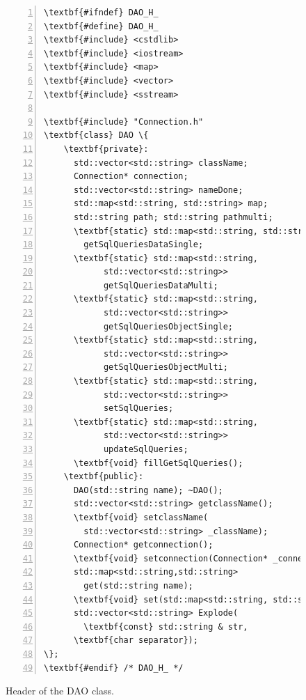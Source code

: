 \begin{figure}[t!h!]
\begin{minipage}{.45\paperwidth}
\begin{mylisting}
\begin{Verbatim}[commandchars=\\\{\},fontsize=\scriptsize, numbers=left, numbersep=2pt]
\textbf{#ifndef} DAO_H_
\textbf{#define} DAO_H_
\textbf{#include} <cstdlib>
\textbf{#include} <iostream>
\textbf{#include} <map>
\textbf{#include} <vector>
\textbf{#include} <sstream>

\textbf{#include} "Connection.h"
\textbf{class} DAO \{
    \textbf{private}:
      std::vector<std::string> className;
      Connection* connection;
      std::vector<std::string> nameDone;
      std::map<std::string, std::string> map;
      std::string path; std::string pathmulti;
      \textbf{static} std::map<std::string, std::string>
        getSqlQueriesDataSingle;
      \textbf{static} std::map<std::string, 
			std::vector<std::string>>
			getSqlQueriesDataMulti;
      \textbf{static} std::map<std::string, 
			std::vector<std::string>>
			getSqlQueriesObjectSingle;
      \textbf{static} std::map<std::string, 
			std::vector<std::string>>
			getSqlQueriesObjectMulti;
      \textbf{static} std::map<std::string, 
			std::vector<std::string>>
			setSqlQueries;
      \textbf{static} std::map<std::string, 
			std::vector<std::string>>
			updateSqlQueries;
      \textbf{void} fillGetSqlQueries();
    \textbf{public}:
      DAO(std::string name); ~DAO();
      std::vector<std::string> getclassName();
      \textbf{void} setclassName(
		std::vector<std::string> _className);
      Connection* getconnection();
      \textbf{void} setconnection(Connection* _connection);
      std::map<std::string,std::string> 
      	get(std::string name);
      \textbf{void} set(std::map<std::string, std::string> data);
      std::vector<std::string> Explode(
		\textbf{const} std::string & str,
      \textbf{char separator});
\};
\textbf{#endif} /* DAO_H_ */
\end{Verbatim}
\end{mylisting}
\end{minipage}
\caption{Header of the DAO class.}
\label{fig:headerdao}
\end{figure}


